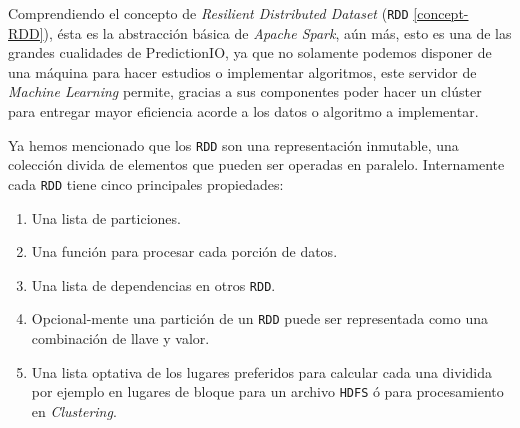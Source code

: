 

  Comprendiendo el concepto de \emph{Resilient Distributed Dataset} (\texttt{RDD} \ref{concept-RDD}), ésta es la abstracción básica de \emph{Apache Spark}, aún más, esto es una de las grandes cualidades de PredictionIO, ya que no solamente podemos disponer de una máquina para hacer estudios o implementar algoritmos, este servidor de \emph{Machine Learning} permite, gracias a sus componentes poder hacer un clúster para entregar mayor eficiencia acorde a los datos o algoritmo a implementar.

  Ya hemos mencionado que los \texttt{RDD} son una representación inmutable, una colección divida de elementos que pueden ser operadas en paralelo. Internamente cada \texttt{RDD} tiene cinco principales propiedades:


  \begin{enumerate}
    \item Una lista de particiones.
    \item Una función para procesar cada porción de datos.
    \item Una lista de dependencias en otros \texttt{RDD}. 
    \item Opcional-mente una partición de un \texttt{RDD} puede ser representada como una combinación de llave y valor. 
    \item Una lista optativa de los lugares preferidos para calcular cada una dividida por ejemplo en lugares de bloque para un archivo \texttt{HDFS} ó para procesamiento en \emph{Clustering}.
  \end{enumerate}
